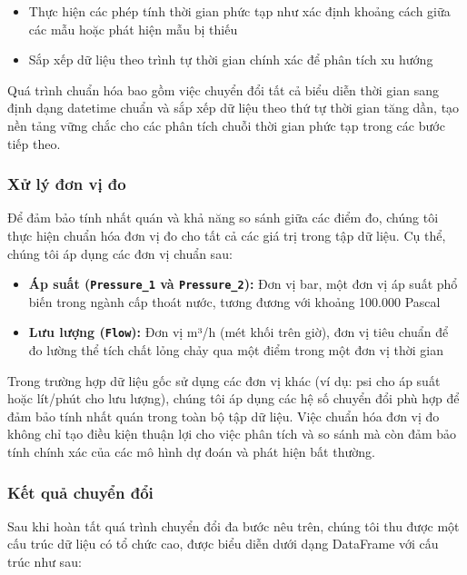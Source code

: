 \begin{itemize}
    \item Thực hiện các phép tính thời gian phức tạp như xác định khoảng cách giữa các mẫu hoặc phát hiện mẫu bị thiếu
    \item Sắp xếp dữ liệu theo trình tự thời gian chính xác để phân tích xu hướng
\end{itemize}

Quá trình chuẩn hóa bao gồm việc chuyển đổi tất cả biểu diễn thời gian sang định dạng datetime chuẩn và sắp xếp dữ liệu theo thứ tự thời gian tăng dần, tạo nền tảng vững chắc cho các phân tích chuỗi thời gian phức tạp trong các bước tiếp theo.

\subsubsection{Xử lý đơn vị đo}
Để đảm bảo tính nhất quán và khả năng so sánh giữa các điểm đo, chúng tôi thực hiện chuẩn hóa đơn vị đo cho tất cả các giá trị trong tập dữ liệu. Cụ thể, chúng tôi áp dụng các đơn vị chuẩn sau:

\begin{itemize}
    \item \textbf{Áp suất (\texttt{Pressure\_1} và \texttt{Pressure\_2}):} Đơn vị bar, một đơn vị áp suất phổ biến trong ngành cấp thoát nước, tương đương với khoảng 100.000 Pascal
    \item \textbf{Lưu lượng (\texttt{Flow}):} Đơn vị m³/h (mét khối trên giờ), đơn vị tiêu chuẩn để đo lường thể tích chất lỏng chảy qua một điểm trong một đơn vị thời gian
\end{itemize}

Trong trường hợp dữ liệu gốc sử dụng các đơn vị khác (ví dụ: psi cho áp suất hoặc lít/phút cho lưu lượng), chúng tôi áp dụng các hệ số chuyển đổi phù hợp để đảm bảo tính nhất quán trong toàn bộ tập dữ liệu. Việc chuẩn hóa đơn vị đo không chỉ tạo điều kiện thuận lợi cho việc phân tích và so sánh mà còn đảm bảo tính chính xác của các mô hình dự đoán và phát hiện bất thường.

\subsubsection{Kết quả chuyển đổi}
Sau khi hoàn tất quá trình chuyển đổi đa bước nêu trên, chúng tôi thu được một cấu trúc dữ liệu có tổ chức cao, được biểu diễn dưới dạng DataFrame với cấu trúc như sau:

